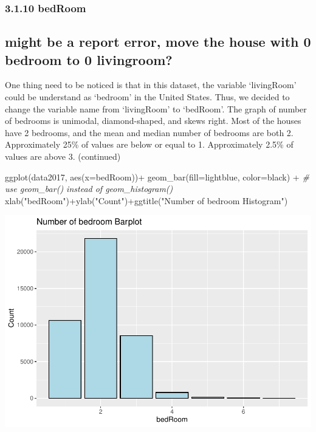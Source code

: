\documentclass[
]{article}
\newenvironment{Shaded}{\begin{snugshade}}{\end{snugshade}}
\newcommand{\AttributeTok}[1]{\textcolor[rgb]{0.77,0.63,0.00}{#1}}
\newcommand{\CommentTok}[1]{\textcolor[rgb]{0.56,0.35,0.01}{\textit{#1}}}
\newcommand{\FunctionTok}[1]{\textcolor[rgb]{0.00,0.00,0.00}{#1}}
\newcommand{\NormalTok}[1]{#1}
\newcommand{\SpecialCharTok}[1]{\textcolor[rgb]{0.00,0.00,0.00}{#1}}
\newcommand{\StringTok}[1]{\textcolor[rgb]{0.31,0.60,0.02}{#1}}
\begin{document}
\hypertarget{bedroom}{%
\subsubsection{3.1.10 bedRoom}\label{bedroom}}

\hypertarget{might-be-a-report-error-move-the-house-with-0-bedroom-to-0-livingroom}{%
\subsection{might be a report error, move the house with 0 bedroom to 0
livingroom?}\label{might-be-a-report-error-move-the-house-with-0-bedroom-to-0-livingroom}}

One thing need to be noticed is that in this dataset, the variable
`livingRoom' could be understand as `bedroom' in the United States.
Thus, we decided to change the variable name from `livingRoom' to
`bedRoom'. The graph of number of bedrooms is unimodal, diamond-shaped,
and skews right. Most of the houses have 2 bedrooms, and the mean and
median number of bedrooms are both 2. Approximately 25\% of values are
below or equal to 1. Approximately 2.5\% of values are above 3.
(continued)

\begin{Shaded}
\begin{Highlighting}[]
\FunctionTok{ggplot}\NormalTok{(data2017, }\FunctionTok{aes}\NormalTok{(}\AttributeTok{x=}\NormalTok{bedRoom))}\SpecialCharTok{+}
  \FunctionTok{geom\_bar}\NormalTok{(}\AttributeTok{fill=}\StringTok{\textquotesingle{}lightblue\textquotesingle{}}\NormalTok{, }\AttributeTok{color=}\StringTok{\textquotesingle{}black\textquotesingle{}}\NormalTok{) }\SpecialCharTok{+} \CommentTok{\# use geom\_bar() instead of geom\_histogram()}
  \FunctionTok{xlab}\NormalTok{(}\StringTok{"bedRoom"}\NormalTok{)}\SpecialCharTok{+}\FunctionTok{ylab}\NormalTok{(}\StringTok{"Count"}\NormalTok{)}\SpecialCharTok{+}\FunctionTok{ggtitle}\NormalTok{(}\StringTok{"Number of bedroom Histogram"}\NormalTok{)}
\end{Highlighting}
\end{Shaded}

\includegraphics{Project_files/figure-latex/unnamed-chunk-19-1.pdf}
\end{document}
